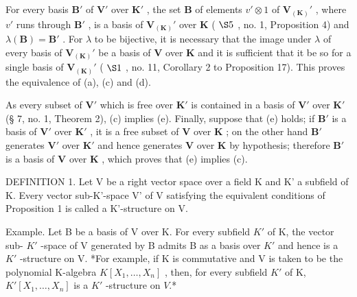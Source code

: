 For every basis \(\mathbf{B}'\) of \(\mathbf{V}'\) over \(\mathbf{K}'\) , the set \(\mathbf{B}\) of elements \(v' \otimes 1\) of \(\mathbf{V}_{(\mathbf{K})}'\) , where \(v'\) runs through \(\mathbf{B}'\) , is a basis of \(\mathbf{V}_{(\mathbf{K})}'\) over \(\mathbf{K}\) ( \(\S 5\) , no. 1, Proposition 4) and \(\lambda(\mathbf{B}) = \mathbf{B}'\) . For \(\lambda\) to be bijective, it is necessary that the image under \(\lambda\) of every basis of \(\mathbf{V}_{(\mathbf{K})}'\) be a basis of \(\mathbf{V}\) over \(\mathbf{K}\) and it is sufficient that it be so for a single basis of \(\mathbf{V}_{(\mathbf{K})}'\) ( \(\S 1\) , no. 11, Corollary 2 to Proposition 17). This proves the equivalence of (a), (c) and (d).

As every subset of \(\mathbf{V}'\) which is free over \(\mathbf{K}'\) is contained in a basis of \(\mathbf{V}'\) over \(\mathbf{K}'\) (§ 7, no. 1, Theorem 2), (c) implies (e). Finally, suppose that (e) holds; if \(\mathbf{B}'\) is a basis of \(\mathbf{V}'\) over \(\mathbf{K}'\) , it is a free subset of \(\mathbf{V}\) over \(\mathbf{K}\) ; on the other hand \(\mathbf{B}'\) generates \(\mathbf{V}'\) over \(\mathbf{K}'\) and hence generates \(\mathbf{V}\) over \(\mathbf{K}\) by hypothesis; therefore \(\mathbf{B}'\) is a basis of \(\mathbf{V}\) over \(\mathbf{K}\) , which proves that (e) implies (c).

DEFINITION 1. Let V be a right vector space over a field K and K' a subfield of K. Every vector sub-K'-space V' of V satisfying the equivalent conditions of Proposition 1 is called a K'-structure on V.

Example. Let B be a basis of V over K. For every subfield \(K'\) of K, the vector sub- \(K'\) -space of V generated by B admits B as a basis over \(K'\) and hence is a \(K'\) -structure on V. *For example, if K is commutative and V is taken to be the polynomial K-algebra \(K[X_{1},\ldots,X_{n}]\) , then, for every subfield \(K'\) of K, \(K'[X_{1},\ldots,X_{n}]\) is a \(K'\) -structure on \(V\).*

